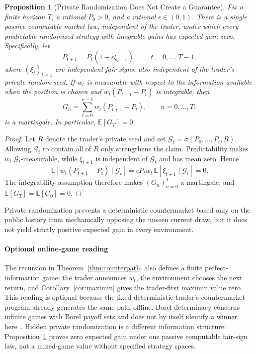 \documentclass[aps,pra,reprint,superscriptaddress,amsmath,amssymb,floatfix]{revtex4-2}
\theoremstyle{plain}
\newtheorem{proposition}[theorem]{Proposition}
\theoremstyle{definition}
\theoremstyle{remark}
\begin{document}
\begin{proposition}[Private Randomization Does Not Create a Guarantee]
  \label{prop:randomized}
  Fix a finite horizon \(T\), a rational \(P_0>0\), and a rational
  \(\epsilon\in(0,1)\). There is a single passive computable market law,
  independent of the trader, under which every predictable randomized strategy
  with integrable gains has expected gain zero. Specifically, let
  \[
    P_{t+1}=P_t(1+\epsilon\xi_{t+1}),
    \qquad t=0,\ldots,T-1,
  \]
  where \((\xi_t)_{t\geq1}\) are independent fair signs, also independent of
  the trader's private random seed. If \(w_t\) is measurable with respect to
  the information available when the position is chosen and
  \(w_t(P_{t+1}-P_t)\) is integrable, then
  \[
    G_n=\sum_{t=0}^{n-1}w_t(P_{t+1}-P_t),
    \qquad n=0,\ldots,T,
  \]
  is a martingale. In particular, \(\mathbb E[G_T]=0\).
\end{proposition}

\begin{proof}
Let \(R\) denote the trader's private seed and set
\(\mathcal G_t=\sigma(P_0,\ldots,P_t,R)\). Allowing \(\mathcal G_t\) to contain
all of \(R\) only strengthens the claim. Predictability makes \(w_t\)
\(\mathcal G_t\)-measurable, while \(\xi_{t+1}\) is independent of
\(\mathcal G_t\) and has mean zero. Hence
\[
 \mathbb E\!\left[
   w_t(P_{t+1}-P_t)\mid\mathcal G_t
 \right]
 =\epsilon P_t w_t\,
   \mathbb E[\xi_{t+1}\mid\mathcal G_t]
 =0.
\]
The integrability assumption therefore makes \((G_n)_{n=0}^T\) a martingale,
and \(\mathbb E[G_T]=\mathbb E[G_0]=0\).
\end{proof}

Private randomization prevents a deterministic countermarket based only on the
public history from mechanically opposing the unseen current draw, but it does
not yield strictly positive expected gain in every environment.

\paragraph{Optional online-game reading}

The recursion in Theorem~\ref{thm:counterpath} also defines a finite
perfect-information game: the trader announces \(w_t\), the environment chooses
the next return, and Corollary~\ref{cor:maximin} gives the trader-first maximin
value zero. This reading is optional because the fixed deterministic trader's
countermarket program already generates the same path offline. Borel
determinacy concerns infinite games with Borel payoff sets and does not by
itself identify a winner here~\cite{Martin1975}. Hidden private randomization is
a different information structure: Proposition~\ref{prop:randomized} proves
zero expected gain under one passive computable fair-sign law, not a mixed-game
value without specified strategy spaces.
\end{document}

